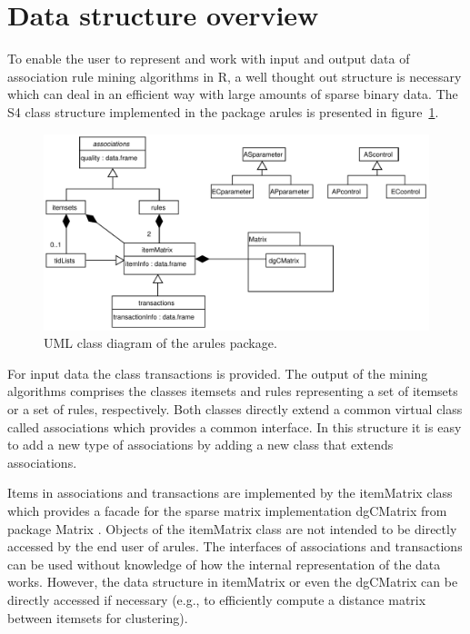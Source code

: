 \documentclass[10pt,a4paper]{article}
\newcommand{\strong}[1]{{\normalfont\fontseries{b}\selectfont #1}}
\newcommand{\class}[1]{\textsf{#1}}
\newcommand{\pkg}[1]{\strong{#1}}
\newcommand{\proglang}[1]{\textsf{#1}}
\begin{document}
\section{Data structure overview\label{sec:overview}}

To enable the user to represent and work with input and output data of
association rule mining algorithms in \proglang{R}, a well thought out
structure is necessary which can deal in an efficient way with large
amounts of sparse binary data.  The \proglang{S4} class structure 
implemented in
the package \pkg{arules} is presented in
figure~\ref{fig:arules-classes}.

\begin{figure}[tp]
\centering
\includegraphics[width=14cm]{arules-classes}
\caption{UML class diagram of the \pkg{arules}
package.\label{fig:arules-classes}}
\end{figure}

For input data the class \class{transactions} is provided.
The output of the mining algorithms comprises the classes
\class{itemsets} and \class{rules} representing a set of itemsets or
a set of rules, respectively.
Both classes directly extend
a common virtual class called \class{associations} which provides a
common interface.
In this structure it is easy to add a new type of associations by adding
a new class that extends \class{associations}.

Items in \class{associations} and \class{transactions} are implemented
by the \class{itemMatrix} class which provides a facade for the sparse
matrix implementation \class{dgCMatrix} from package \pkg{Matrix}
\citep{arules:Bates+Maechler:2005}.
Objects of the \class{itemMatrix} class are not intended to be directly
accessed by the end user of \pkg{arules}.  The interfaces of
\class{associations} and \class{transactions} can be used without
knowledge of how the internal representation of the data works.
However, the data structure in \class{itemMatrix} or even the
\class{dgCMatrix} can be directly accessed if necessary (e.g., to
efficiently compute a distance matrix between itemsets for clustering).
\end{document}
